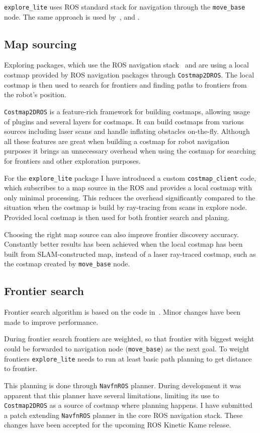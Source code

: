 \texttt{explore\_lite} uses \gls{ROS} standard stack for navigation through the \texttt{move\_base} node. The same approach is used by~\cite{DuHadway2010}, \cite{Bovbel2010} and \cite{Andre2014}.

\subsection{Map sourcing}

Exploring packages, which use the \gls{ROS} navigation stack~\cite{Bovbel2010} and \cite{DuHadway2010} are using a local costmap provided by \gls{ROS} navigation packages through \texttt{Cost\-map\-2D\-ROS}. The local costmap is then used to search for frontiers and finding paths to frontiers from the robot's position.

\texttt{Costmap2DROS} is a feature-rich framework for building costmaps, allowing usage of plugins and several layers for costmaps. It can build costmaps from various sources including laser scans and handle inflating obstacles on-the-fly. Although all these features are great when building a costmap for robot navigation purposes it brings an unnecessary overhead when using the costmap for searching for frontiers and other exploration purposes.

For the \texttt{explore\_lite} package I have introduced a custom \texttt{costmap\_client} code, which subscribes to a map source in the \gls{ROS} and provides a local costmap with only minimal processing. This reduces the overhead significantly compared to the situation when the costmap is build by ray-tracing from scans in explore node. Provided local costmap is then used for both frontier search and planing.

Choosing the right map source can also improve frontier discovery accuracy. Constantly better results has been achieved when the local costmap has been built from \gls{SLAM}-constructed map, instead of a laser ray-traced costmap, such as the costmap created by \texttt{move\_base} node.

\subsection{Frontier search}

Frontier search algorithm is based on the code in~\cite{DuHadway2010}. Minor changes have been made to improve performance.

During frontier search frontiers are weighted, so that frontier with biggest weight could be forwarded to navigation node (\texttt{move\_base}) as the next goal. To weight frontiers \texttt{explore\_lite} needs to run at least basic path planning to get distance to frontier.

This planning is done through \texttt{NavfnROS} planner. During development it was apparent that this planner have several limitations, limiting its use to \texttt{Cost\-map\-2D\-ROS} as a source of costmap where planning happens. I have submitted a patch extending \texttt{NavfnROS} planner in the core \gls{ROS} navigation stack. These changes have been accepted for the upcoming \gls{ROS} Kinetic Kame release.


